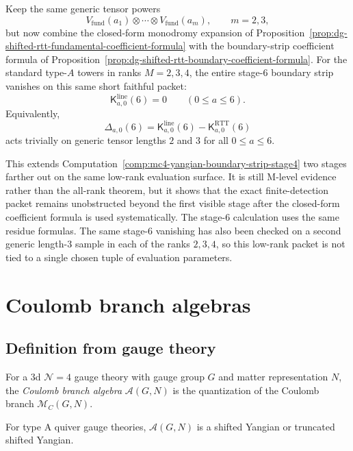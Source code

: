 \begin{computation}
\label{comp:mc4-yangian-boundary-strip-stage6}
Keep the same generic tensor powers
\[
V_{\mathrm{fund}}(a_1)\otimes\cdots\otimes V_{\mathrm{fund}}(a_m),
\qquad m=2,3,
\]
but now combine the closed-form monodromy expansion of
Proposition~\ref{prop:dg-shifted-rtt-fundamental-coefficient-formula}
with the boundary-strip coefficient formula of
Proposition~\ref{prop:dg-shifted-rtt-boundary-coefficient-formula}.
For the standard type-$A$ towers in ranks $M=2,3,4$, the entire
stage-$6$ boundary strip vanishes on this same short faithful packet:
\[
\mathsf{K}^{\mathrm{line}}_{a,0}(6)=0
\qquad (0\le a\le 6).
\]
Equivalently,
\[
\Delta_{a,0}(6)
=
\mathsf{K}^{\mathrm{line}}_{a,0}(6)
-\mathsf{K}^{\mathrm{RTT}}_{a,0}(6)
\]
acts trivially on generic tensor lengths $2$ and $3$ for all
$0\le a\le 6$.

This extends
Computation~\ref{comp:mc4-yangian-boundary-strip-stage4}
two stages farther out on the same low-rank evaluation surface.  It is
still M-level evidence rather than the all-rank theorem, but it shows
that the exact finite-detection packet remains unobstructed beyond the
first visible stage after the closed-form coefficient formula is used
systematically.  The stage-$6$ calculation uses the same residue formulas.
The same stage-$6$ vanishing has also been checked on a second generic
length-$3$ sample in each of the ranks $2,3,4$, so this low-rank
packet is not tied to a single chosen tuple of evaluation parameters.
\end{computation}

\section{Coulomb branch algebras}
\label{sec:coulomb-branch}

\subsection{Definition from gauge theory}

\begin{definition}\label{def:coulomb-branch}
For a 3d $\mathcal{N} = 4$ gauge theory with gauge group $G$ and matter representation $N$, 
the \emph{Coulomb branch algebra} $\mathcal{A}(G, N)$ is the quantization of the 
Coulomb branch $\mathcal{M}_C(G, N)$.

For type A quiver gauge theories, $\mathcal{A}(G, N)$ is a shifted Yangian or 
truncated shifted Yangian.
\end{definition}

